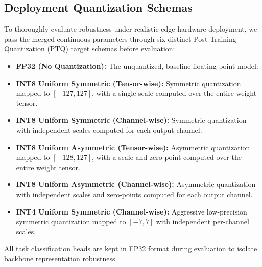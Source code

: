 \subsection{Deployment Quantization Schemas}
To thoroughly evaluate robustness under realistic edge hardware deployment, we pass the merged continuous parameters through six distinct Post-Training Quantization (PTQ) target schemas before evaluation:
\begin{itemize}
    \item \textbf{FP32 (No Quantization):} The unquantized, baseline floating-point model.
    \item \textbf{INT8 Uniform Symmetric (Tensor-wise):} Symmetric quantization mapped to $[-127, 127]$, with a single scale computed over the entire weight tensor.
    \item \textbf{INT8 Uniform Symmetric (Channel-wise):} Symmetric quantization with independent scales computed for each output channel.
    \item \textbf{INT8 Uniform Asymmetric (Tensor-wise):} Asymmetric quantization mapped to $[-128, 127]$, with a scale and zero-point computed over the entire weight tensor.
    \item \textbf{INT8 Uniform Asymmetric (Channel-wise):} Asymmetric quantization with independent scales and zero-points computed for each output channel.
    \item \textbf{INT4 Uniform Symmetric (Channel-wise):} Aggressive low-precision symmetric quantization mapped to $[-7, 7]$ with independent per-channel scales.
\end{itemize}
All task classification heads are kept in FP32 format during evaluation to isolate backbone representation robustness.

